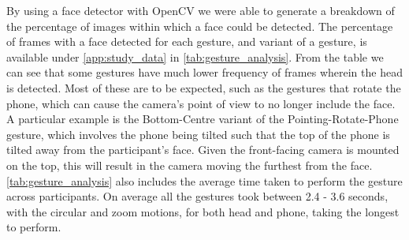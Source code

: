 By using a face detector\cite{yu2022yunet} with OpenCV we were able to generate a breakdown of the percentage of images within which a face could be detected. The percentage of frames with a face detected for each gesture, and variant of a gesture, is available under \autoref{app:study_data} in \autoref{tab:gesture_analysis}. 
From the table we can see that some gestures have much lower frequency of frames wherein the head is detected. Most of these are to be expected, such as the gestures that rotate the phone, which can cause the camera's point of view to no longer include the face. A particular example is the Bottom-Centre variant of the Pointing-Rotate-Phone gesture, which involves the phone being tilted such that the top of the phone is tilted away from the participant's face. Given the front-facing camera is mounted on the top, this will result in the camera moving the furthest from the face.
\autoref{tab:gesture_analysis} also includes the average time taken to perform the gesture across participants.
On average all the gestures took between 2.4 - 3.6 seconds, with the circular and zoom motions, for both head and phone, taking the longest to perform.

